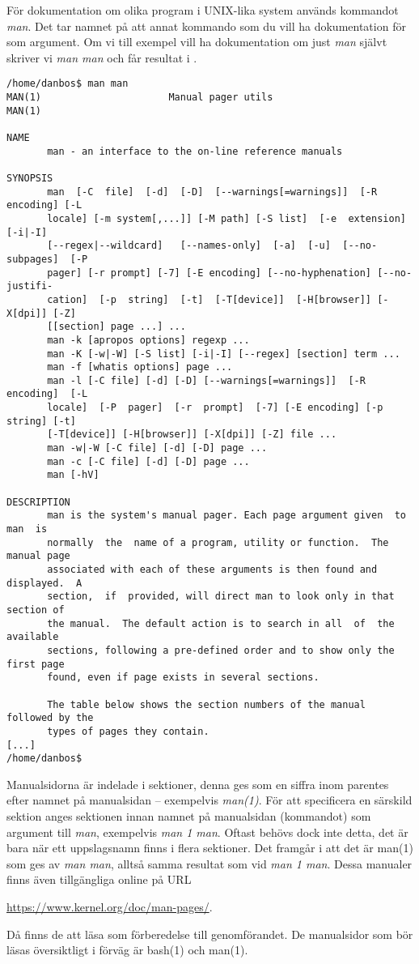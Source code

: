 \documentclass[11pt,a4paper]{miunasgn}
\begin{document}
För dokumentation om olika program i UNIX-lika system används kommandot 
\emph{man}.
Det tar namnet på att annat kommando som du vill ha dokumentation för som 
argument.
Om vi till exempel vill ha dokumentation om just \emph{man} självt skriver vi 
\emph{man man} och får resultat i .
\begin{lstlisting}[float=tbp,caption={Resultatet av kommandoraden \emph{man 
	man}.},label={lst:manman}]
/home/danbos$ man man
MAN(1)						Manual pager utils						MAN(1)

NAME
	   man - an interface to the on-line reference manuals

SYNOPSIS
	   man  [-C  file]  [-d]  [-D]  [--warnings[=warnings]]  [-R encoding] [-L
	   locale] [-m system[,...]] [-M path] [-S list]  [-e  extension]  [-i|-I]
	   [--regex|--wildcard]   [--names-only]  [-a]  [-u]  [--no-subpages]  [-P
	   pager] [-r prompt] [-7] [-E encoding] [--no-hyphenation] [--no-justifi-
	   cation]  [-p  string]  [-t]  [-T[device]]  [-H[browser]] [-X[dpi]] [-Z]
	   [[section] page ...] ...
	   man -k [apropos options] regexp ...
	   man -K [-w|-W] [-S list] [-i|-I] [--regex] [section] term ...
	   man -f [whatis options] page ...
	   man -l [-C file] [-d] [-D] [--warnings[=warnings]]  [-R  encoding]  [-L
	   locale]  [-P  pager]  [-r  prompt]  [-7] [-E encoding] [-p string] [-t]
	   [-T[device]] [-H[browser]] [-X[dpi]] [-Z] file ...
	   man -w|-W [-C file] [-d] [-D] page ...
	   man -c [-C file] [-d] [-D] page ...
	   man [-hV]

DESCRIPTION
	   man is the system's manual pager. Each page argument given  to  man  is
	   normally  the  name of a program, utility or function.  The manual page
	   associated with each of these arguments is then found and displayed.  A
	   section,  if  provided, will direct man to look only in that section of
	   the manual.  The default action is to search in all  of  the  available
	   sections, following a pre-defined order and to show only the first page
	   found, even if page exists in several sections.

	   The table below shows the section numbers of the manual followed by the
	   types of pages they contain.
[...]
/home/danbos$
\end{lstlisting}
Manualsidorna är indelade i sektioner, denna ges som en siffra inom parentes 
efter namnet på manualsidan -- exempelvis \emph{man(1)}.
För att specificera en särskild sektion anges sektionen innan namnet på 
manualsidan (kommandot) som argument till \emph{man}, exempelvis \emph{man 
1 man}.
Oftast behövs dock inte detta, det är bara när ett uppslagsnamn finns i flera 
sektioner.
Det framgår i  att det är man(1) som ges av \emph{man 
man}, alltså samma resultat som vid \emph{man 1 man}.
Dessa manualer finns även tillgängliga online på URL
\begin{center}
	\url{https://www.kernel.org/doc/man-pages/}.
\end{center}
Då finns de att läsa som förberedelse till genomförandet.
De manualsidor som bör läsas översiktligt i förväg är bash(1) och man(1).
\end{document}
